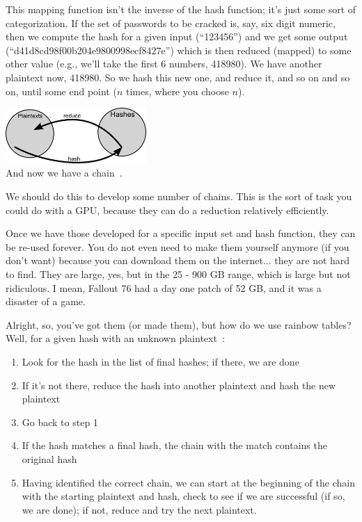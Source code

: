 \documentclass[a4paper]{report}
\begin{document}
This mapping function isn't the inverse of the hash function; it's just some sort of categorization. If the set of passwords to be cracked is, say, six digit numeric, then we compute the hash for a given input (``123456'') and we get some output (``d41d8cd98f00b204e9800998ecf8427e'') which is then reduced (mapped) to some other value (e.g., we'll take the first 6 numbers, 418980). We have another plaintext now, 418980. So we hash this new one, and reduce it, and so on and so on, until some end point ($n$ times, where you choose $n$). 

\begin{center}
	\includegraphics[width=0.4\textwidth]{images/rainbow-tables-reduce.png}\\
	And now we have a chain~\cite{rainbowtables}.
\end{center}

We should do this to develop some number of chains. This is the sort of task you could do with a GPU, because they can do a reduction relatively efficiently. 

Once we have those developed for a specific input set and hash function, they can be re-used forever. You do not even need to make them yourself anymore (if you don't want) because you can download them on the internet... they are not hard to find. They are large, yes, but in the 25 - 900 GB range, which is large  but not ridiculous. I mean, Fallout 76 had a day one patch of 52 GB, and it was a disaster of a game.

Alright, so, you've got them (or made them), but how do we use rainbow tables? Well, for a given hash with an unknown plaintext~\cite{rainbowtables}:
\begin{enumerate}
	\item Look for the hash in the list of final hashes; if there, we are done
	\item If it's not there, reduce the hash into another plaintext and hash the new plaintext
	\item Go back to step 1
	\item If the hash matches a final hash, the chain with the match contains the original hash
	\item Having identified the correct chain, we can start at the beginning of the chain with the starting plaintext and hash, check to see if we are successful (if so, we are done); if not, reduce and try the next plaintext. 
\end{enumerate} 
\end{document}
